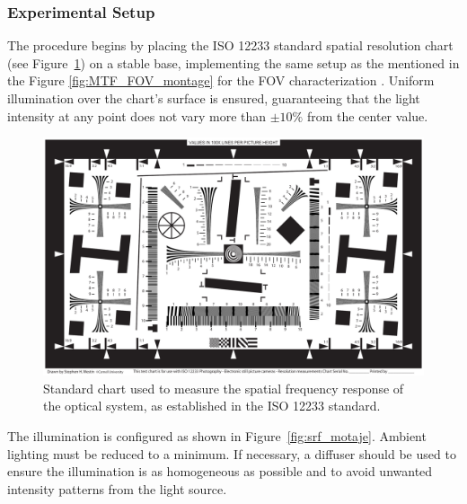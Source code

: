 \subsubsection{Experimental Setup}

\noindent The procedure begins by placing the ISO 12233 standard spatial resolution chart (see Figure~\ref{fig:iso12233_test_chart}) on a stable base, implementing the same setup as the mentioned in the Figure \ref{fig:MTF_FOV_montage} for the FOV characterization    . Uniform illumination over the chart’s surface is ensured, guaranteeing that the light intensity at any point does not vary more than $\pm 10\%$ from the center value.\\

\begin{figure}[H]
    \centering
    \includegraphics[width=0.95\linewidth]{Figures/C3/ISO_12233-reschart.pdf}
    \caption{Standard chart used to measure the spatial frequency response of the optical system, as established in the ISO 12233 standard.}
    \label{fig:iso12233_test_chart}
\end{figure}

\noindent The illumination is configured as shown in Figure~\ref{fig:srf_motaje}. Ambient lighting must be reduced to a minimum. If necessary, a diffuser should be used to ensure the illumination is as homogeneous as possible and to avoid unwanted intensity patterns from the light source.\\ 



